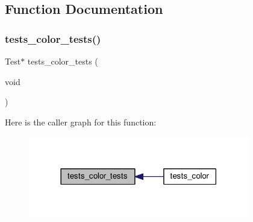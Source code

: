 \subsection{Function Documentation}
\mbox{\label{tests-color_8c_a1cf5866040e284d76c57251551585fee}} 
\subsubsection{\texorpdfstring{tests\+\_\+color\+\_\+tests()}{tests\_color\_tests()}}
{\footnotesize\ttfamily Test$\ast$ tests\+\_\+color\+\_\+tests (\begin{DoxyParamCaption}\item[{void}]{ }\end{DoxyParamCaption})}

Here is the caller graph for this function\+:
\nopagebreak
\begin{figure}[H]
\begin{center}
\leavevmode
\includegraphics[width=273pt]{tests-color_8c_a1cf5866040e284d76c57251551585fee_icgraph}
\end{center}
\end{figure}
